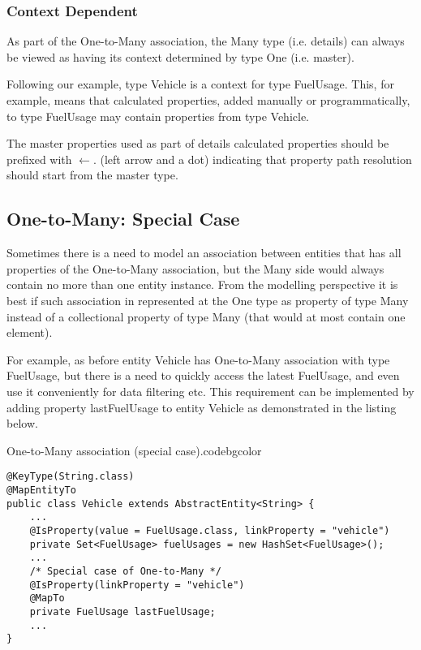   \subsubsection{Context Dependent}

  As part of the One-to-Many association, the Many type (i.e. details) can always be viewed as having its context determined by type One (i.e. master).

  Following our example, type Vehicle is a context for type FuelUsage. This, for example, means that calculated properties, added manually or programmatically, to type FuelUsage may contain properties from type Vehicle.

  The master properties used as part of details calculated properties should be prefixed with $\leftarrow.$ (left arrow and a dot) indicating that property path resolution should start from the master type.

\subsection{One-to-Many: Special Case}

  Sometimes there is a need to model an association between entities that has all properties of the One-to-Many association, but the Many side would always contain no more than one entity instance. From the modelling perspective it is best if such association in represented at the One type as property of type Many instead of a collectional property of type Many (that would at most contain one element).

  For example, as before entity Vehicle has One-to-Many association with type FuelUsage, but there is a need to quickly access the latest FuelUsage, and even use it conveniently for data filtering etc. This requirement can be implemented by adding property lastFuelUsage to entity Vehicle as demonstrated in the listing below.

  \begin{code}{One-to-Many association (special case).}{\label{lst:One2ManySpecialCase}}{codebgcolor}
    \begin{lstlisting}
@KeyType(String.class)
@MapEntityTo
public class Vehicle extends AbstractEntity<String> {
    ...
    @IsProperty(value = FuelUsage.class, linkProperty = "vehicle") 
    private Set<FuelUsage> fuelUsages = new HashSet<FuelUsage>();   
    ...
    /* Special case of One-to-Many */
    @IsProperty(linkProperty = "vehicle")
    @MapTo
    private FuelUsage lastFuelUsage;   
    ...
} 
    \end{lstlisting}
  \end{code}

